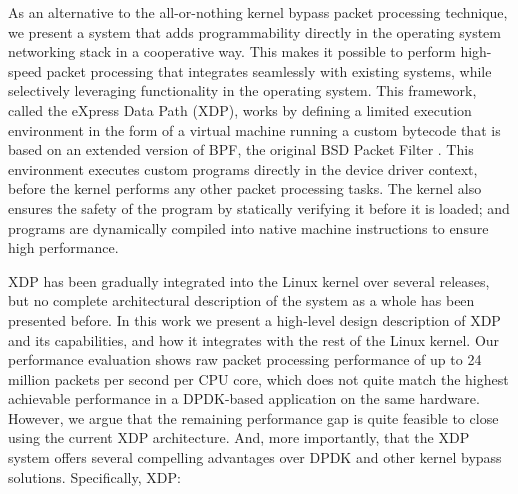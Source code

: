 \documentclass[sigconf]{acmart}
\begin{document}
As an alternative to the all-or-nothing kernel bypass packet processing
technique, we present a system that adds programmability directly in the
operating system networking stack in a cooperative way. This makes it possible
to perform high-speed packet processing that integrates seamlessly with existing
systems, while selectively leveraging functionality in the operating system.
This framework, called the eXpress Data Path (XDP), works by defining a limited
execution environment in the form of a virtual machine running a custom bytecode
that is based on an extended version of BPF, the original BSD Packet Filter
\cite{mccanne_bsd_1993}. This environment executes custom programs directly in
the device driver context, before the kernel performs any other packet processing
tasks. The kernel also ensures the safety of the program by statically verifying
it before it is loaded; and programs are dynamically compiled into native machine
instructions to ensure high performance.

XDP has been gradually integrated into the Linux kernel over several releases,
but no complete architectural description of the system as a whole has been
presented before. In this work we present a high-level design description of XDP
and its capabilities, and how it integrates with the rest of the Linux kernel.
Our performance evaluation shows raw packet processing performance of up to 24
million packets per second per CPU core, which does not quite match the highest
achievable performance in a DPDK-based application on the same hardware.
However, we argue that the remaining performance gap is quite feasible to close
using the current XDP architecture. And, more importantly, that the XDP system
offers several compelling advantages over DPDK and other kernel bypass
solutions. Specifically, XDP:
\end{document}
